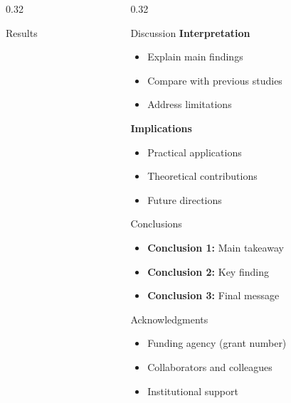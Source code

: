 \documentclass[final,t]{beamer}
\begin{document}
\begin{frame}[t]
\begin{columns}[t]
\begin{column}{0.32\paperwidth}
\begin{block}{Results}
  \end{block}

\end{column}

\begin{column}{0.32\paperwidth}

  \begin{block}{Discussion}
    \textbf{Interpretation}
    \begin{itemize}
      \item Explain main findings
      \item Compare with previous studies
      \item Address limitations
    \end{itemize}

    \vspace{0.5em}

    \textbf{Implications}
    \begin{itemize}
      \item Practical applications
      \item Theoretical contributions
      \item Future directions
    \end{itemize}
  \end{block}

  \vspace{1em}

  \begin{block}{Conclusions}
    \begin{itemize}
      \item \textbf{Conclusion 1:} Main takeaway
      \item \textbf{Conclusion 2:} Key finding
      \item \textbf{Conclusion 3:} Final message
    \end{itemize}
  \end{block}

  \vspace{1em}

  \begin{block}{Acknowledgments}
    \begin{itemize}
      \item Funding agency (grant number)
      \item Collaborators and colleagues
      \item Institutional support
    \end{itemize}
  \end{block}


\end{column}
\end{columns}
\end{frame}
\end{document}
